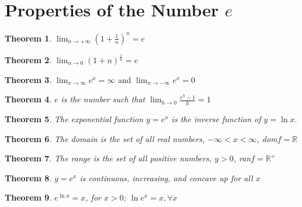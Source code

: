 \documentclass[10pt]{report}
\newtheorem{thm2}{Theorem}[section]
\begin{document}
\section{Properties of the Number $e$}
\begin{thm2}$\lim_{n\to +\infty}(1 + \frac{1}{n})^{n}=e$ \end{thm2}
\begin{thm2}$\lim_{n\to 0}(1 + n)^\frac{1}{n}=e$ \end{thm2}
\begin{thm2}$\lim_{x\to \infty} e^x=\infty \text{ and } \lim_{x\to -\infty} e^x=0$ \end{thm2}
\begin{thm2}$e$ is the number such that $\lim_{h\to 0}\frac{e^h-1}{h}=1$ \end{thm2}
\begin{thm2}The exponential function $y=e^x$ is the inverse function of $y=\ln{x}.$\end{thm2}
\begin{thm2}The domain is the set of all real numbers, $-\infty<x<\infty$, dom$f=\mathbb{R}$\end{thm2}
\begin{thm2}The range is the set of all positive numbers, $y>0$, ran$f=\mathbb{R}^+$\end{thm2}
\begin{thm2}$y=e^x$ is continuous, increasing, and concave up for all $x$\end{thm2}
\begin{thm2}$e^{\ln{x}}=x$, for $x>0$; $\ln{e^x}=x, \forall x$\end{thm2}
\end{document}
